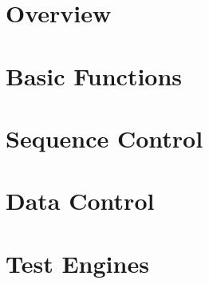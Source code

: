 \documentclass[12pt,letterpaper,extrafontsizes]{memoir}
\begin{document}
\mainmatter

\chapter{Overview}


\chapter{Basic Functions}


\chapter{Sequence Control}


\chapter{Data Control}


\chapter{Test Engines}





\end{document}
